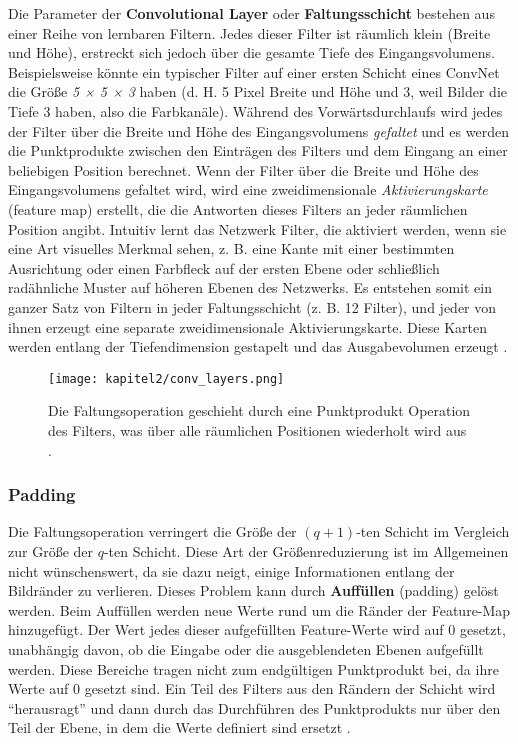     Die Parameter der  \textbf{Convolutional Layer} oder \textbf{Faltungsschicht} bestehen aus einer Reihe von lernbaren Filtern. Jedes dieser Filter ist räumlich klein (Breite und Höhe), erstreckt sich jedoch über die gesamte Tiefe des Eingangsvolumens. Beispielsweise könnte ein typischer Filter auf einer ersten Schicht eines ConvNet die Größe \textit{5 × 5 × 3} haben (d. H. 5 Pixel Breite und Höhe und 3, weil Bilder die Tiefe 3 haben, also die Farbkanäle). Während des Vorwärtsdurchlaufs wird jedes der Filter über die Breite und Höhe des Eingangsvolumens \textit{gefaltet} und es werden die Punktprodukte zwischen den Einträgen des Filters und dem Eingang an einer beliebigen Position berechnet. Wenn der Filter über die Breite und Höhe des Eingangsvolumens gefaltet wird, wird eine zweidimensionale \textit{Aktivierungskarte} (feature map) erstellt, die die Antworten dieses Filters an jeder räumlichen Position angibt. Intuitiv lernt das Netzwerk Filter, die aktiviert werden, wenn sie eine Art visuelles Merkmal sehen, z. B. eine Kante mit einer bestimmten Ausrichtung oder einen Farbfleck auf der ersten Ebene oder schließlich radähnliche Muster auf höheren Ebenen des Netzwerks. Es entstehen somit ein ganzer Satz von Filtern in jeder Faltungsschicht (z. B. 12 Filter), und jeder von ihnen erzeugt eine separate zweidimensionale Aktivierungskarte. Diese Karten werden entlang der Tiefendimension gestapelt und das Ausgabevolumen erzeugt \cite*{StanfordUniversityCoursecs231n2018a}.

    \begin{figure}[H]
        \centering
        \texttt{[image: kapitel2/conv\_layers.png]}
        \caption[Die Faltung in einem CNN]{Die Faltungsoperation geschieht durch eine Punktprodukt Operation des Filters, was über alle räumlichen Positionen wiederholt wird aus \cite*[321]{Aggarwal2018}.}
        \label{Kap2:Conv}
    \end{figure}

    \subsubsection{Padding}
    Die Faltungsoperation verringert die Größe der $(q + 1)$-ten Schicht im Vergleich zur Größe der $q$-ten Schicht. Diese Art der Größenreduzierung ist im Allgemeinen nicht wünschenswert, da sie dazu neigt, einige Informationen entlang der Bildränder zu verlieren. Dieses Problem kann durch \textbf{Auffüllen} (padding) gelöst werden. Beim Auffüllen werden neue Werte rund um die Ränder der Feature-Map hinzugefügt. Der Wert jedes dieser aufgefüllten Feature-Werte wird auf 0 gesetzt, unabhängig davon, ob die Eingabe oder die ausgeblendeten Ebenen aufgefüllt werden. Diese Bereiche tragen nicht zum endgültigen Punktprodukt bei, da ihre Werte auf 0 gesetzt sind. Ein Teil des Filters aus den Rändern der Schicht wird \enquote{herausragt} und dann durch das Durchführen des Punktprodukts nur über den Teil der Ebene, in dem die Werte definiert sind ersetzt \cite*[323]{Aggarwal2018}.


